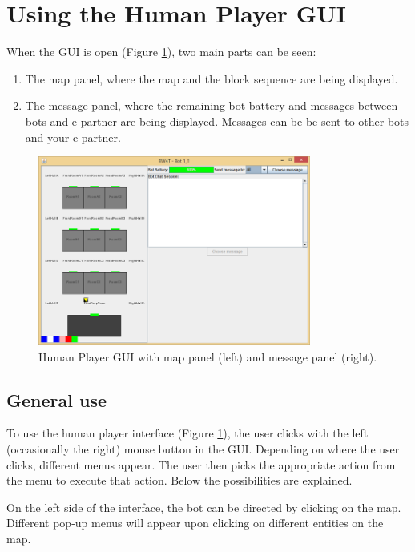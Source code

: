
\section{Using the Human Player GUI}\label{ch:usingHI} 

When the GUI is open (Figure \ref{fig:humanPlayerGUI}), two main parts can be seen:
\begin{enumerate}
\item The map panel, where the map and the block sequence are being displayed.
\item The message panel, where the remaining bot battery and messages between bots and e-partner are being displayed. Messages can be be sent to other bots and your e-partner.
\end{enumerate}


\begin{figure}[h]
\begin{center}
\includegraphics[width = 0.8\textwidth]{HumanPlayerGUI/hpg.png}
\caption{Human Player GUI with map panel (left) and message panel (right).}
\label{fig:humanPlayerGUI}
\end{center}
\end{figure}

\subsection{General use}
To use the human player interface (Figure \ref{fig:humanPlayerGUI}), the user clicks with the left (occasionally the right) mouse button in the GUI. Depending on where the user clicks, different menus appear. The user then picks the appropriate action from the menu to execute that action. Below the possibilities are explained.

On the left side of the interface, the bot can be directed by clicking on the map. Different pop-up menus will appear upon clicking on different entities on the map.

